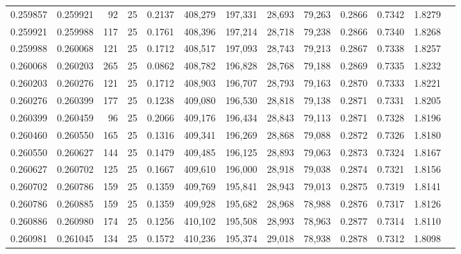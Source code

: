 \begin{tabular}{rrrrrrrrrrrrr}
0.259857 & 0.259921 &    92 &  25 &                                     0.2137 & 408,279 & 197,331 &  28,693 &  79,263 & 0.2866 & 0.7342 & 1.8279 \\
0.259921 & 0.259988 &   117 &  25 &                                     0.1761 & 408,396 & 197,214 &  28,718 &  79,238 & 0.2866 & 0.7340 & 1.8268 \\
0.259988 & 0.260068 &   121 &  25 &                                     0.1712 & 408,517 & 197,093 &  28,743 &  79,213 & 0.2867 & 0.7338 & 1.8257 \\
0.260068 & 0.260203 &   265 &  25 &                                     0.0862 & 408,782 & 196,828 &  28,768 &  79,188 & 0.2869 & 0.7335 & 1.8232 \\
0.260203 & 0.260276 &   121 &  25 &                                     0.1712 & 408,903 & 196,707 &  28,793 &  79,163 & 0.2870 & 0.7333 & 1.8221 \\
0.260276 & 0.260399 &   177 &  25 &                                     0.1238 & 409,080 & 196,530 &  28,818 &  79,138 & 0.2871 & 0.7331 & 1.8205 \\
0.260399 & 0.260459 &    96 &  25 &                                     0.2066 & 409,176 & 196,434 &  28,843 &  79,113 & 0.2871 & 0.7328 & 1.8196 \\
0.260460 & 0.260550 &   165 &  25 &                                     0.1316 & 409,341 & 196,269 &  28,868 &  79,088 & 0.2872 & 0.7326 & 1.8180 \\
0.260550 & 0.260627 &   144 &  25 &                                     0.1479 & 409,485 & 196,125 &  28,893 &  79,063 & 0.2873 & 0.7324 & 1.8167 \\
0.260627 & 0.260702 &   125 &  25 &                                     0.1667 & 409,610 & 196,000 &  28,918 &  79,038 & 0.2874 & 0.7321 & 1.8156 \\
0.260702 & 0.260786 &   159 &  25 &                                     0.1359 & 409,769 & 195,841 &  28,943 &  79,013 & 0.2875 & 0.7319 & 1.8141 \\
0.260786 & 0.260885 &   159 &  25 &                                     0.1359 & 409,928 & 195,682 &  28,968 &  78,988 & 0.2876 & 0.7317 & 1.8126 \\
0.260886 & 0.260980 &   174 &  25 &                                     0.1256 & 410,102 & 195,508 &  28,993 &  78,963 & 0.2877 & 0.7314 & 1.8110 \\
0.260981 & 0.261045 &   134 &  25 &                                     0.1572 & 410,236 & 195,374 &  29,018 &  78,938 & 0.2878 & 0.7312 & 1.8098 \\

\end{tabular}
